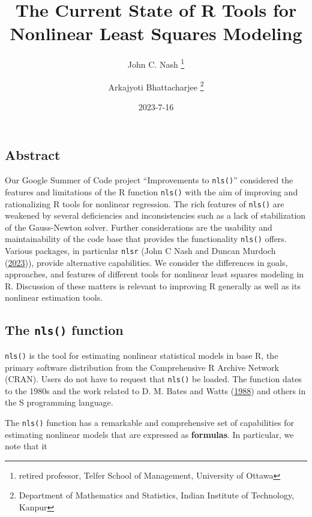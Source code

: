 \documentclass[
]{article}
\title{The Current State of R Tools for Nonlinear Least Squares
Modeling}
\author{John C. Nash
\thanks{ retired professor, Telfer School of Management, University of Ottawa} \and Arkajyoti
Bhattacharjee
\thanks{Department of Mathematics and Statistics, Indian Institute of Technology, Kanpur}}
\date{2023-7-16}
\begin{document}
\maketitle

\hypertarget{abstract}{%
\subsection{Abstract}\label{abstract}}

Our Google Summer of Code project ``Improvements to \texttt{nls()}''
considered the features and limitations of the R function \texttt{nls()}
with the aim of improving and rationalizing R tools for nonlinear
regression. The rich features of \texttt{nls()} are weakened by several
deficiencies and inconsistencies such as a lack of stabilization of the
Gauss-Newton solver. Further considerations are the usability and
maintainability of the code base that provides the functionality
\texttt{nls()} offers. Various packages, in particular \texttt{nlsr}
(John C Nash and Duncan Murdoch
(\protect\hyperlink{ref-nlsr2023manual}{2023})), provide alternative
capabilities. We consider the differences in goals, approaches, and
features of different tools for nonlinear least squares modeling in R.
Discussion of these matters is relevant to improving R generally as well
as its nonlinear estimation tools.

\hypertarget{the-nls-function}{%
\subsection{\texorpdfstring{The \texttt{nls()}
function}{The nls() function}}\label{the-nls-function}}

\texttt{nls()} is the tool for estimating nonlinear statistical models
in base R, the primary software distribution from the Comprehensive R
Archive Network (CRAN). Users do not have to request that \texttt{nls()}
be loaded. The function dates to the 1980s and the work related to D. M.
Bates and Watts (\protect\hyperlink{ref-bateswatts}{1988}) and others in
the S programming language.

The \texttt{nls()} function has a remarkable and comprehensive set of
capabilities for estimating nonlinear models that are expressed as
\textbf{formulas}. In particular, we note that it
\end{document}
